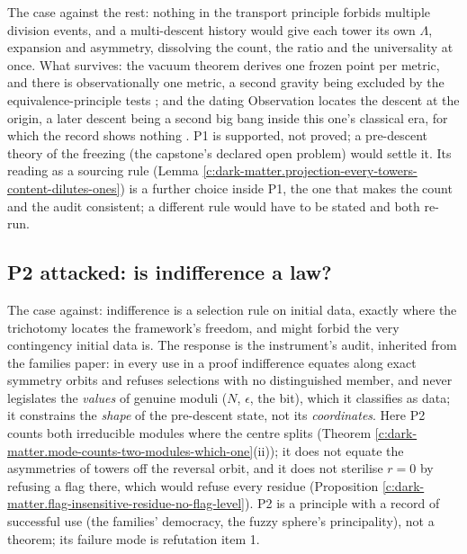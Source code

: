 \documentclass[11pt]{article}
\theoremstyle{definition}
\theoremstyle{plain}
\begin{document}
The case against the rest: nothing in the transport principle forbids multiple division events, and a multi-descent history would give each tower its own $\Lambda$, expansion and asymmetry, dissolving the count, the ratio and the universality at once. What survives: the vacuum theorem derives one frozen point per metric, and there is observationally one metric, a second gravity being excluded by the equivalence-principle tests \cite{ButlerT6}; and the dating Observation locates the descent at the origin, a later descent being a second big bang inside this one's classical era, for which the record shows nothing \cite[Obs.~7.4]{ButlerT12}. P1 is supported, not proved; a pre-descent theory of the freezing (the capstone's declared open problem) would settle it. Its reading as a sourcing rule (Lemma \ref{c:dark-matter.projection-every-towers-content-dilutes-ones}) is a further choice inside P1, the one that makes the count and the audit consistent; a different rule would have to be stated and both re-run.

\subsection*{P2 attacked: is indifference a law?}
\label{c:note.dark-matter.setting-p2-attacked-indifference-law}
The case against: indifference is a selection rule on initial data, exactly where the trichotomy locates the framework's freedom, and might forbid the very contingency initial data is. The response is the instrument's audit, inherited from the families paper: in every use in a proof indifference equates along exact symmetry orbits and refuses selections with no distinguished member, and never legislates the \emph{values} of genuine moduli ($N$, $\epsilon$, the bit), which it classifies as data; it constrains the \emph{shape} of the pre-descent state, not its \emph{coordinates}. Here P2 counts both irreducible modules where the centre splits (Theorem \ref{c:dark-matter.mode-counts-two-modules-which-one}(ii)); it does not equate the asymmetries of towers off the reversal orbit, and it does not sterilise $r = 0$ by refusing a flag there, which would refuse every residue (Proposition \ref{c:dark-matter.flag-insensitive-residue-no-flag-level}). P2 is a principle with a record of successful use (the families' democracy, the fuzzy sphere's principality), not a theorem; its failure mode is refutation item 1.
\end{document}
